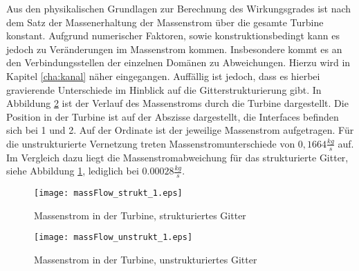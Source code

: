 Aus den physikalischen Grundlagen zur Berechnung des Wirkungsgrades ist nach dem Satz der Massenerhaltung der Massenstrom über die gesamte Turbine konstant.
Aufgrund numerischer Faktoren, sowie konstruktionsbedingt kann es jedoch zu Veränderungen im Massenstrom kommen. 
Insbesondere kommt es an den Verbindungsstellen der einzelnen Domänen zu Abweichungen. Hierzu wird in Kapitel \ref{cha:kanal} näher eingegangen.
Auffällig ist jedoch, dass es hierbei gravierende Unterschiede im Hinblick auf die Gitterstrukturierung gibt. In Abbildung \ref{fig:massFlowUnstrukt} ist der Verlauf des Massenstroms durch die Turbine dargestellt. Die Position in der Turbine ist auf der Abszisse dargestellt, die Interfaces befinden sich bei 1 und 2. Auf der Ordinate ist der jeweilige Massenstrom aufgetragen. Für die unstrukturierte Vernetzung treten Massenstromunterschiede von $0,1664 \frac{kg}{s}$ auf. Im Vergleich dazu liegt die Massenstromabweichung für das strukturierte Gitter, siehe Abbildung \ref{fig:massFlowStrukt}, lediglich bei $0.00028\frac{kg}{s}$.

 \begin{figure}[htbp]
	\centering
	\texttt{[image: massFlow\_strukt\_1.eps]}
	\caption{Massenstrom in der Turbine, strukturiertes Gitter} \label{fig:massFlowStrukt}
\end{figure} 
 \begin{figure}[htbp]
	\centering
	\texttt{[image: massFlow\_unstrukt\_1.eps]}
	\caption{Massenstrom in der Turbine, unstrukturiertes Gitter} \label{fig:massFlowUnstrukt}
\end{figure} 
